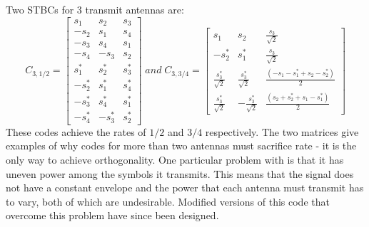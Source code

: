 \begin{itemize}
Two STBCs for 3 transmit antennas are:
\[
C_{3,1/2}= \left[\begin{array}{ccc}
s_1 & s_2 & s_3\\
-s_2 & s_1 & s_4\\
-s_3 & s_4 & s_1\\
-s_4 & -s_3 & s_2\\
s^*_1 & s^*_2 & s^*_3\\
-s^*_2 & s^*_1 & s^*_4\\
-s^*_3 & s^*_4 & s^*_1\\
-s^*_4 & -s^*_3 & s^*_2
\end{array} \right] \;and\; C_{3,3/4}=
\left[\begin{array}{ccc}
s_1 & s_2 & \frac{s_3}{\sqrt{2}}\\
-s^*_2 & s^*_1 & \frac{s_3}{\sqrt{2}}\\
\frac{s^*_3}{\sqrt{2}} & \frac{s^*_3}{\sqrt{2}} & \frac{(-s_1-s^*_1+s_2-s^*_2)}{2}\\
\frac{s^*_3}{\sqrt{2}} & -\frac{s^*_3}{\sqrt{2}} &
\frac{(s_2+s^*_2+s_1-s^*_1)}{2}
\end{array} \right]
\]
These codes achieve the rates of $1/2$ and $3/4$ respectively. The
two matrices give examples of why codes for more than two antennas
must sacrifice rate - it is the only way to achieve orthogonality.
One particular problem with   is that it has uneven power among the
symbols it transmits. This means that the signal does not have a
constant envelope and the power that each antenna must transmit has
to vary, both of which are undesirable. Modified versions of this
code that overcome this problem have since been designed.


\end{itemize}
